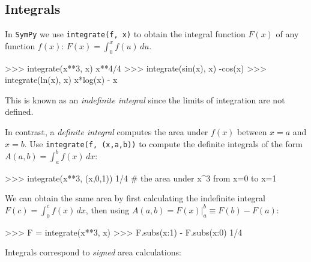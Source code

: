 \subsection{Integrals}
\label{calculus:integrals}


In \texttt{SymPy} we use \texttt{integrate(f, x)} to obtain the integral function $F(x)$ of any function $f(x)$:
$F(x) = \int_0^x f(u)\,du$.

\small
\begin{verbatimtab}
>>> integrate(x**3, x)
x**4/4
>>> integrate(sin(x), x)
-cos(x)
>>> integrate(ln(x), x)
x*log(x) - x
\end{verbatimtab}
\normalsize
This is known as an \emph{indefinite integral} since the limits of integration are not defined. 

In contrast, 
a \emph{definite integral} computes the area under $f(x)$ between $x=a$ and $x=b$.
Use \texttt{integrate(f, (x,a,b))} to compute the definite integrals of the form $A(a,b)=\int_a^b f(x) \, dx$:

\small
\begin{verbatimtab}
>>> integrate(x**3, (x,0,1))    
1/4              # the area under x^3 from x=0 to x=1
\end{verbatimtab}
\normalsize

\noindent
We can obtain the same area by first calculating the indefinite integral $F(c)=\int_0^c \!f(x)\,dx$,
then using $A(a,b) = F(x)\big\vert_a^b \equiv F(b) - F(a)$:



\small
\begin{verbatimtab}
>>> F = integrate(x**3, x)
>>> F.subs({x:1}) - F.subs({x:0})   
1/4
\end{verbatimtab}
\normalsize
Integrals correspond to \emph{signed} area calculations:



